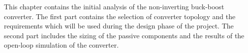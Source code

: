 
This chapter contains the initial analysis of the non-inverting buck-boost converter. The first part contains the selection of converter topology and the requirements which will be used during the design phase of the project. The second part includes the sizing of the passive components and the results of the open-loop simulation of the converter.

